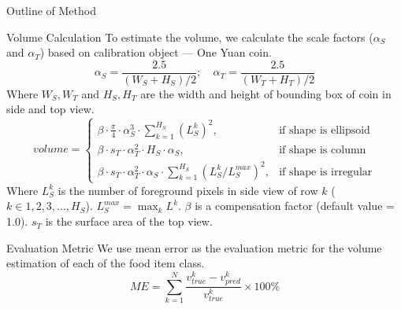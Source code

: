\documentclass{beamer}
\begin{document}
	\begin{frame}{Outline of Method}
		\begin{block}{Volume Calculation}\tiny
			To estimate the volume\cite{vol}, we calculate the scale factors ($\alpha_S$ and $\alpha_T$) based on calibration object --- One Yuan coin.
			\begin{equation}
				\alpha_S = \frac{2.5}{(W_S + H_S)/2}; \quad
				\alpha_T = \frac{2.5}{(W_T + H_T)/2}
			\end{equation}
			Where $W_S, W_T$ and $H_S, H_T$ are the width and height of bounding box of coin in side and top view.
			\begin{equation}\label{E:vol}
				volume = 
				\begin{cases}
					\beta \cdot \frac{\pi}{4} \cdot \alpha_S^3 \cdot \sum_{k=1}^{H_S} (L^k_S)^2, &\text{if shape is ellipsoid} \\
					\beta \cdot  s_T \cdot \alpha_T^2 \cdot H_S \cdot \alpha_S, &\text{if shape is column} \\
					\beta \cdot  s_T \cdot \alpha_T^2 \cdot \alpha_S \cdot \sum_{k=1}^{H_S} \left(L^k_S/L_S^{max}\right)^2, &\text{if shape is irregular} 
				\end{cases}
			\end{equation}
			Where $L^k_S$ is the number of foreground pixels in side view of row $k$ ($k \in 1, 2, 3, \dots , H_S$). $L^{max}_S = \max_{k} L^k$. $\beta$ is a compensation factor (default value = 1.0).  $s_T$ is the surface area of the top view.
		\end{block}\pause
		\begin{block}{Evaluation Metric}\tiny
			We use mean error as the evaluation metric for the volume estimation of each of the food item class.
			\begin{equation}
				ME = \sum_{k=1}^{N} \frac{v_{true}^k-v_{pred}^k}{v_{true}^k}\times 100 \%
			\end{equation}
		\end{block}
	\end{frame}
	
\end{document}
